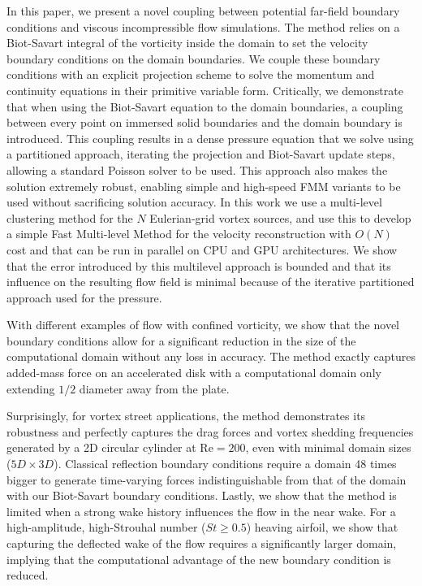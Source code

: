 \documentclass[final,1p,times]{elsarticle}
\begin{document}
In this paper, we present a novel coupling between potential far-field boundary conditions and viscous incompressible flow simulations. The method relies on a Biot-Savart integral of the vorticity inside the domain to set the velocity boundary conditions on the domain boundaries. We couple these boundary conditions with an explicit projection scheme to solve the momentum and continuity equations in their primitive variable form. Critically, we demonstrate that when using the Biot-Savart equation to the domain boundaries, a coupling between every point on immersed solid boundaries and the domain boundary is introduced. This coupling results in a dense pressure equation that we solve using a partitioned approach, iterating the projection and Biot-Savart update steps, allowing a standard Poisson solver to be used. This approach also makes the solution extremely robust, enabling simple and high-speed FMM variants to be used without sacrificing solution accuracy. In this work we use a multi-level clustering method for the $N$ Eulerian-grid vortex sources, and use this to develop a simple Fast Multi-level Method for the velocity reconstruction with $O(N)$ cost and that can be run in parallel on CPU and GPU architectures. We show that the error introduced by this multilevel approach is bounded and that its influence on the resulting flow field is minimal because of the iterative partitioned approach used for the pressure.

With different examples of flow with confined vorticity, we show that the novel boundary conditions allow for a significant reduction in the size of the computational domain without any loss in accuracy. The method exactly captures added-mass force on an accelerated disk with a computational domain only extending $1/2$ diameter away from the plate. 

Surprisingly, for vortex street applications, the method demonstrates its robustness and perfectly captures the drag forces and vortex shedding frequencies generated by a 2D circular cylinder at $\text{Re}=200$, even with minimal domain sizes ($5D\times3D$). Classical reflection boundary conditions require a domain 48 times bigger to generate time-varying forces indistinguishable from that of the domain with our Biot-Savart boundary conditions. Lastly, we show that the method is limited when a strong wake history influences the flow in the near wake. For a high-amplitude, high-Strouhal number ($St\ge0.5$) heaving airfoil, we show that capturing the deflected wake of the flow requires a significantly larger domain, implying that the computational advantage of the new boundary condition is reduced.
\end{document}
